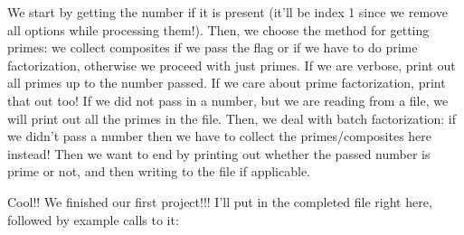 \documentclass[12pt, twoside, reqno]{book}
\begin{document}
We start by getting the number if it is present (it'll be index 1 since we remove all options while processing them!). Then, we choose the method for getting primes: we collect composites if we pass the flag or if we have to do prime factorization, otherwise we proceed with just primes. If we are verbose, print out all primes up to the number passed. If we care about prime factorization, print that out too! If we did not pass in a number, but we are reading from a file, we will print out all the primes in the file. Then, we deal with batch factorization: if we didn't pass a number then we have to collect the primes/composites here instead! Then we want to end by printing out whether the passed number is prime or not, and then writing to the file if applicable.

Cool!! We finished our first project!!! I'll put in the completed file right here, followed by example calls to it:
\end{document}
